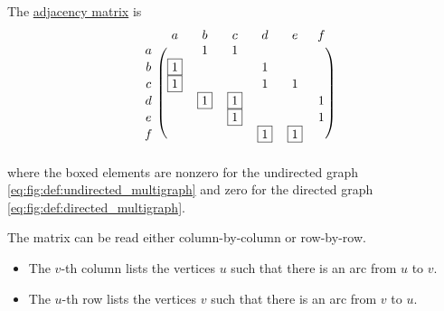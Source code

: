 \begin{example}
  The \hyperref[def:graph_adjacency_matrix]{adjacency matrix} is
  \begin{equation}\label{ex:directed multigraph_matrices/adjacency}
    \begin{blockarray}{cccccccc}
        & a        & b        & c        & d        & e        & f \\
    \begin{block}{c(ccccccc)}
      a &          & 1        & 1        &          &          &   \\
      b & \fbox{1} &          &          & 1        &          &   \\
      c & \fbox{1} &          &          & 1        & 1        &   \\
      d &          & \fbox{1} & \fbox{1} &          &          & 1 \\
      e &          &          & \fbox{1} &          &          & 1 \\
      f &          &          &          & \fbox{1} & \fbox{1} &   \\
    \end{block}
    \end{blockarray}
  \end{equation}
  where the boxed elements are nonzero for the undirected graph \eqref{eq:fig:def:undirected_multigraph} and zero for the directed graph \eqref{eq:fig:def:directed_multigraph}.

  The matrix can be read either column-by-column or row-by-row.
  \begin{itemize}
    \item The \( v \)-th column lists the vertices \( u \) such that there is an arc from \( u \) to \( v \).
    \item The \( u \)-th row lists the vertices \( v \) such that there is an arc from \( v \) to \( u \).
  \end{itemize}
\end{example}


